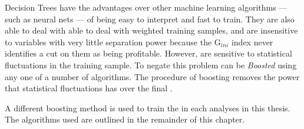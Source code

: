 
Decision Trees have the advantages over other machine learning algorithms ---
such as neural nets --- of being easy to interpret and fast to train.
They are also able to deal with
able to deal with weighted training samples, and are insensitive
to variables with very little separation power because the
$\mathrm{G}_{ini}$ index never identifies a cut on them as being profitable.
However, \DTs are sensitive to statistical fluctuations in the training sample.
To negate this problem \DTs can be \emph{Boosted} using any one of a number of algorithms.
The procedure of boosting removes the power that statistical fluctuations has over the final
\BDT.

A different boosting method is used to train the \BDTs in each analyses in this thesis.
The algorithms used are outlined in the remainder of this chapter.



